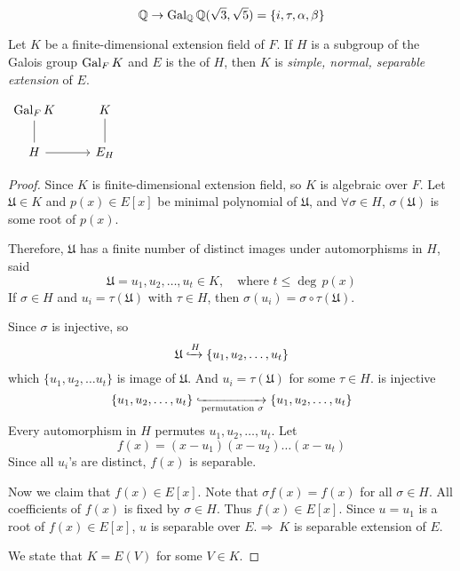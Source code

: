 \begin{example}
    \[
        \mathbb{Q} \rightarrow \operatorname{Gal}_\mathbb{Q} \mathbb{Q}(\sqrt{3}, \sqrt{5}) = \{i, \tau, \alpha, \beta \}
    \]
\end{example}

\begin{lemma}
    Let $K$ be a finite-dimensional extension field of $F$. If $H$ is a subgroup of the Galois group 
    $\operatorname{Gal}_F K$ and $E$ is the  of $H$, then $K$ is 
    \textit{simple, normal, separable extension} of $E$.

    \begin{center}
        $\begin{tikzcd}
            \gal_F K  
            & K \arrow[dash]{d} \\
            H \arrow[dash]{u} \arrow[r]
            & E_H
            \end{tikzcd}
        $
    \end{center}
\end{lemma}
\begin{proof}
    Since $K$ is finite-dimensional extension field, so $K$ is algebraic over $F$. Let $\mathfrak{U} \in K$ and 
    $p(x) \in E[x]$ be minimal polynomial of $\mathfrak{U}$, and $\forall \sigma \in H$, $\sigma(\mathfrak{U})$ is 
    some root of $p(x)$.

    Therefore, $\mathfrak{U}$ has a finite number of distinct images under automorphisms in $H$, said 
    \[
        \mathfrak{U} = u_1, u_2, \ldots, u_t \in K, \quad \text{where } t \leq \deg\, p(x)
    \]
    If $\sigma \in H$ and $u_i = \tau(\mathfrak{U})$ with $\tau \in H$, then $\sigma(u_i) = \sigma \circ \tau (\mathfrak{U})$.

    Since $\sigma$ is injective, so 
    \[
        \mathfrak{U} \xhookrightarrow{H} \{ u_1, u_2, \ldots, u_t \}
    \]
    which $\{ u_1, u_2, \ldots u_t\}$ is image of $\mathfrak{U}$. And $u_i = \tau(\mathfrak{U})$ for some $\tau \in H$.
    is injective 
    \[
        \{ u_1, u_2, \ldots, u_t \} \xhookrightarrow[\text{permutation } \sigma]{} \{ u_1, u_2, \ldots, u_t \}
    \]
    Every automorphism in $H$ permutes $u_1, u_2, \ldots, u_t$. Let 
    \[
        f(x) = (x-u_1)(x-u_2)\ldots(x-u_t)
    \]
    Since all $u_i$'s are distinct, $f(x)$ is separable.

    Now we claim that $f(x) \in E[x]$. Note that $\sigma f(x) = f(x)$ for all $\sigma \in H$. All coefficients of 
    $f(x)$ is fixed by $\sigma \in H$. Thus $f(x) \in E[x]$. Since $u = u_1$ is a root of $f(x) \in E[x]$, $u$ is separable over 
    $E. \Longrightarrow \> K$ is separable extension of $E$.

    We state that $K = E(V)$ for some $V \in K$. 
\end{proof}

